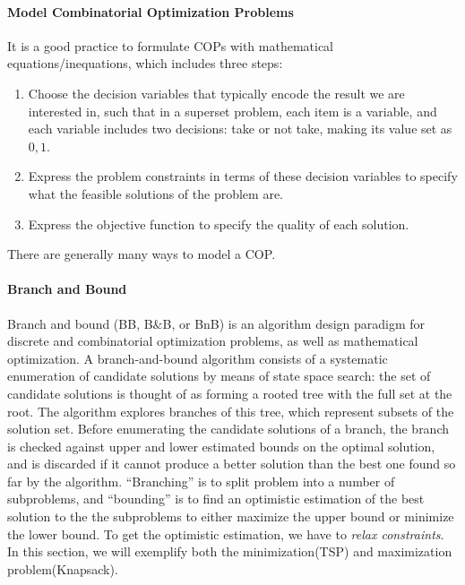 \documentclass[../main.tex]{subfiles}
\begin{document}
\paragraph{Model Combinatorial Optimization Problems} It is a  good practice to formulate COPs with mathematical equations/inequations, which includes  three steps:
\begin{enumerate}
    \item Choose the decision variables that typically encode the result we are interested in, such that in a superset problem, each item is a variable, and each variable includes two decisions: take or not take, making its value set as ${0, 1}$.
    \item Express the problem constraints in terms of these decision variables to specify what the feasible solutions of the problem are.
    \item Express the objective function to specify the quality of each solution.
\end{enumerate}
There are generally many ways to model a COP.


\paragraph{Branch and Bound} Branch and bound (BB, B$\&$B, or BnB) is an algorithm design paradigm for discrete and combinatorial optimization problems, as well as mathematical optimization. A branch-and-bound algorithm consists of a systematic enumeration of candidate solutions by means of state space search: the set of candidate solutions is thought of as forming a rooted tree with the full set at the root. The algorithm explores branches of this tree, which represent subsets of the solution set. Before enumerating the candidate solutions of a branch, the branch is checked against upper and lower estimated bounds on the optimal solution, and is discarded if it cannot produce a better solution than the best one found so far by the algorithm. ``Branching'' is to split problem into a number of subproblems, and ``bounding'' is to find an optimistic estimation of the best solution to the the subproblems to either maximize the upper bound or minimize the lower bound.  To get the optimistic estimation, we have to \textit{relax constraints}.  In this section, we will exemplify both the minimization(TSP) and maximization problem(Knapsack). 
\end{document}
